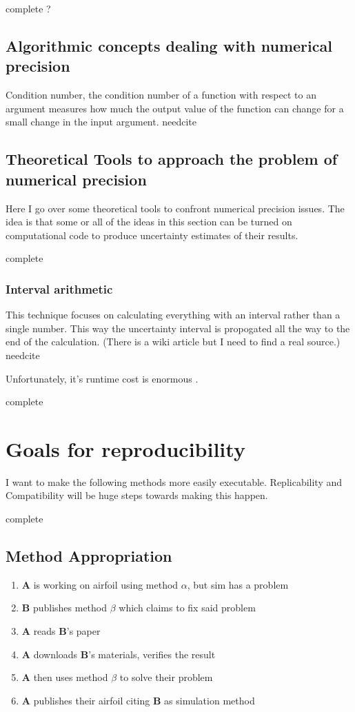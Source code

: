 \documentclass{article}
\newcommand{\complete}{
	\gls{complete}
}
\newcommand{\needcite}{
	\gls{needcite}
}
\begin{document}
\complete?

\subsection{Algorithmic concepts dealing with numerical precision}

Condition number, the condition number of a function with respect to an argument measures how much the output value of the function can change for a small change in the input argument. \needcite

\subsection{Theoretical Tools to approach the problem of numerical precision}

Here I go over some theoretical tools to confront numerical precision issues. The idea is that some or all of the ideas in this section can be turned on computational code to produce uncertainty estimates of their results.

\complete

\subsubsection{Interval arithmetic}

This technique focuses on calculating everything with an interval rather than a single number. This way the uncertainty interval is propogated all the way to the end of the calculation. (There is a wiki article but I need to find a real source.) \needcite

Unfortunately, it's runtime cost is enormous \cite{dhb-numerical-bugs}.

\complete

\section{Goals for reproducibility}

I want to make the following methods more easily executable. Replicability and Compatibility will be huge steps towards making this happen.

\complete

\subsection{Method Appropriation}

\begin{enumerate}
\item \textbf{A} is working on airfoil using method \boldmath$\alpha$, but sim has a problem
\item \textbf{B} publishes method $\beta$ which claims to fix said problem
\item \textbf{A} reads \textbf{B}'s paper
\item \textbf{A} downloads \textbf{B}'s materials, verifies the result
\item \textbf{A} then uses method $\beta$ to solve their problem
\item \textbf{A} publishes their airfoil citing \textbf{B} as simulation method
\end{enumerate}
\end{document}
